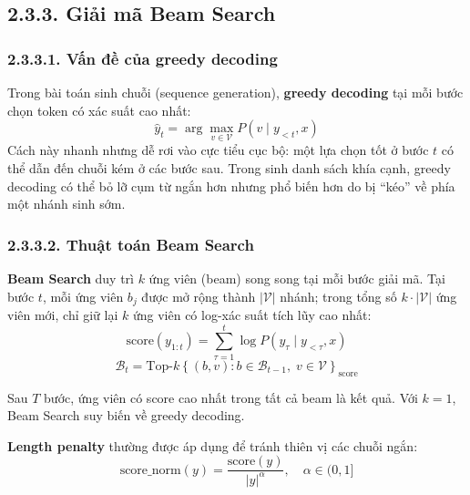 \subsection{2.3.3.\; Giải mã Beam Search}
\label{subsec:beam_search}

\subsubsection{2.3.3.1.\; Vấn đề của greedy decoding}

Trong bài toán sinh chuỗi (sequence generation), \textbf{greedy decoding}
tại mỗi bước chọn token có xác suất cao nhất:
\begin{equation}
\hat{y}_t = \arg\max_{v \in \mathcal{V}} P(v \mid y_{<t}, x)
\label{eq:greedy}
\end{equation}
Cách này nhanh nhưng dễ rơi vào cực tiểu cục bộ: một lựa chọn tốt ở
bước $t$ có thể dẫn đến chuỗi kém ở các bước sau. Trong sinh danh sách
khía cạnh, greedy decoding có thể bỏ lỡ cụm từ ngắn hơn nhưng phổ biến
hơn do bị ``kéo'' về phía một nhánh sinh sớm.

\subsubsection{2.3.3.2.\; Thuật toán Beam Search}

\textbf{Beam Search} duy trì $k$ ứng viên (beam) song song tại mỗi bước
giải mã. Tại bước $t$, mỗi ứng viên $b_j$ được mở rộng thành $|\mathcal{V}|$
nhánh; trong tổng số $k \cdot |\mathcal{V}|$ ứng viên mới, chỉ giữ lại
$k$ ứng viên có log-xác suất tích lũy cao nhất:
\begin{equation}
\text{score}(y_{1:t}) = \sum_{\tau=1}^{t} \log P(y_\tau \mid y_{<\tau}, x)
\label{eq:beam_score}
\end{equation}
\begin{equation}
\mathcal{B}_t = \text{Top-}k\!\left\{
  (b, v) : b \in \mathcal{B}_{t-1},\; v \in \mathcal{V}
\right\}_{\text{score}}
\label{eq:beam_topk}
\end{equation}

Sau $T$ bước, ứng viên có score cao nhất trong tất cả beam là kết quả.
Với $k=1$, Beam Search suy biến về greedy decoding.

\textbf{Length penalty} thường được áp dụng để tránh thiên vị các chuỗi
ngắn:
\begin{equation}
\text{score\_norm}(y) = \frac{\text{score}(y)}{|y|^\alpha},\quad \alpha \in (0,1]
\label{eq:length_penalty}
\end{equation}


